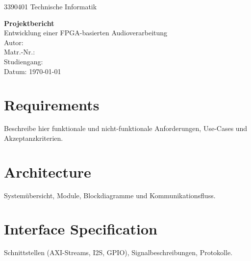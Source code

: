 \documentclass[12pt,a4paper,bibliography=totoc,listof=totoc]{scrartcl}
\begin{document}
{3390401}
{Technische Informatik}

\begin{center}
  {\LARGE \textbf{Projektbericht}}\\[1em]
  {\large Entwicklung einer FPGA-basierten Audioverarbeitung}\\[2em]
  \vspace{2em}
  Autor: \studentName\\
  Matr.-Nr.: \studentMatnr\\
  Studiengang: \studentStudiengang\\
  Datum: \today
\end{center}

\setcounter{page}{1}

\tableofcontents
\pagebreak

\setcounter{page}{1}

\section{Requirements}
Beschreibe hier funktionale und nicht-funktionale Anforderungen, Use-Cases und Akzeptanzkriterien.

\section{Architecture}
Systemübersicht, Module, Blockdiagramme und Kommunikationsfluss.

\section{Interface Specification}
Schnittstellen (AXI-Streams, I2S, GPIO), Signalbeschreibungen, Protokolle.
\end{document}
